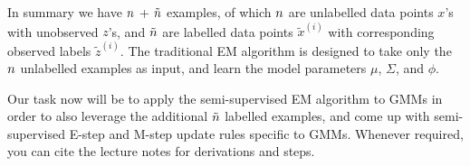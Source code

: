 In summary we have ${n}$ + $\tilde{{n}}$ examples, of which ${n}$ are unlabelled data points $x$'s with unobserved $z$'s, and $\tilde{{n}}$ are labelled data points $\tilde{x}^{(i)}$ with corresponding observed labels $\tilde{z}^{(i)}$. The traditional EM algorithm is designed to take only the ${n}$ unlabelled examples as input, and learn the model parameters $\mu$, $\Sigma$, and $\phi$.


Our task now will be to apply the semi-supervised EM algorithm to GMMs in order to also leverage the additional $\tilde{{n}}$ labelled examples, and come up with semi-supervised E-step and M-step update rules specific to GMMs. Whenever required, you can cite the lecture notes for derivations and steps.


\begin{enumerate}
  \setcounter{enumii}{1}
  
\ifnum{} {
  
} \fi

  
\ifnum{} {
  
} \fi


  
\ifnum{} {
  
} \fi

  
\ifnum{} {
  
} \fi

  
\ifnum{} {
  
} \fi

\end{enumerate}

